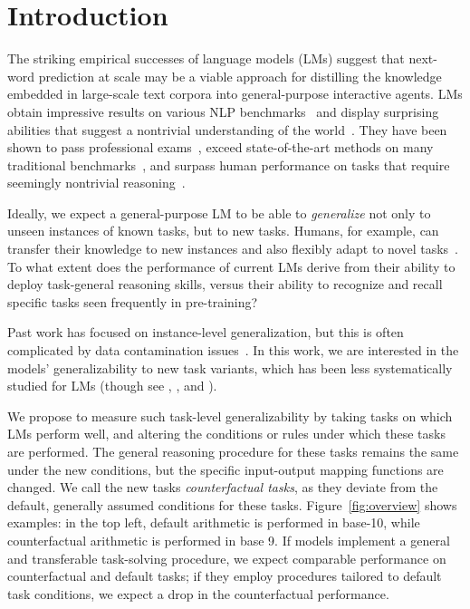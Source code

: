 
\section{Introduction} \label{sec:intro}

\hspace{-.7em}
The striking empirical successes of language models (LMs) suggest 
that next-word prediction at scale
may be a viable approach for distilling the knowledge embedded in large-scale text corpora into general-purpose interactive agents. LMs obtain impressive results on various NLP benchmarks~ and display surprising abilities that suggest a nontrivial understanding of the  world~\citep{bubeck2023sparks}. They have been shown to pass professional exams~, exceed state-of-the-art methods on many traditional benchmarks~, and surpass human performance on tasks that require seemingly nontrivial reasoning~. 

Ideally, we expect a general-purpose LM to be able to \emph{generalize} not only to unseen instances of known tasks, but to new tasks. Humans, for example, can transfer their knowledge to new instances and also flexibly adapt to novel tasks~\citep{singley1989transfer}. To what extent does the performance of current LMs derive from their ability to deploy task-general reasoning skills, versus their ability to recognize and recall specific tasks seen frequently in pre-training?

Past work has focused on instance-level generalization, but this is often complicated by data contamination issues~. In this work, we are interested in the models' generalizability to new task variants, which has been less systematically studied for LMs (though see \citet{li-etal-2022-quantifying}, \citet{mishra-etal-2022-cross}, and \citet{wang-etal-2022-super}). 

We propose to measure such task-level generalizability by taking tasks on which LMs perform well, and altering the conditions or rules under which these tasks are performed.
The general reasoning procedure for these tasks remains the same under the new conditions, but the specific input-output mapping functions are changed.
We call the new tasks \emph{counterfactual tasks}, as they deviate from the default, generally assumed conditions for these tasks. Figure~\ref{fig:overview} shows examples: in the top left, default arithmetic is performed in base-10, while counterfactual arithmetic is performed in base 9.
If models implement a general and transferable task-solving procedure, we expect comparable performance on counterfactual and default tasks; if they employ procedures tailored to default task conditions, we expect a drop in the counterfactual performance.


